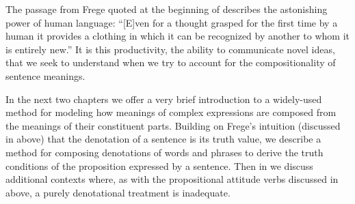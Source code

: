 The passage from Frege quoted at the beginning of  describes the astonishing power of human language: “[E]ven for a thought grasped for the first time by a human it provides a clothing in which it can be recognized by another to whom it is entirely new.” It is this productivity, the ability to communicate novel ideas, that we seek to understand when we try to account for the compositionality of sentence meanings.



In the next two chapters we offer a very brief introduction to a widely-used method for modeling how meanings of complex expressions are composed from the meanings of their constituent parts. Building on Frege’s intuition (discussed in  above) that the denotation of a sentence is its truth value, we describe a method for composing denotations of words and phrases to derive the truth conditions of the proposition expressed by a sentence. Then in  we discuss additional contexts where, as with the propositional attitude verbs discussed in  above, a purely denotational treatment is inadequate.



